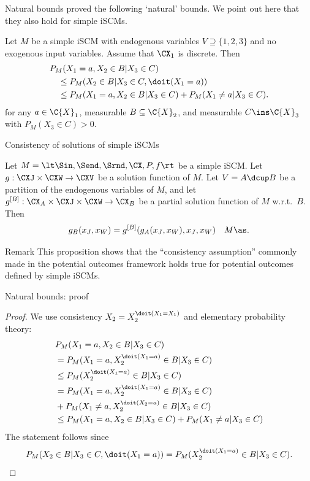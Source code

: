 \begin{frame}{Natural bounds}
\cite{ManskiNagin1998} proved the following `natural' bounds. We point out here that they also hold for simple iSCMs.
\begin{Thm}
  Let $M$ be a simple iSCM with endogenous variables $V \supseteq \{1,2,3\}$ and no exogenous input variables.
  Assume that $\CX_1$ is discrete.
  Then
  \begin{equation*}\begin{split}
    &P_M(X_1=a,X_2 \in B|X_3 \in C) \\
    &\quad\le P_M(X_2\in B|X_3 \in C, \doit(X_1=a)) \\
    &\quad\le P_M(X_1=a,X_2\in B|X_3 \in C) + P_M(X_1\ne a|X_3 \in C).
  \end{split}\end{equation*}
  for any $a\in\C{X}_1$, measurable $B \subseteq \C{X}_2$, and measurable $C \ins \C{X}_3$ with $P_M(X_3 \in C) > 0$.
\end{Thm}
\end{frame}

\begin{frame}{Consistency of solutions of simple iSCMs}
\begin{Prp}[\ref{prp:simple_scm_consistency}]
  Let $M = \lt \Sin, \Send, \Srnd, \CX, P, f \rt$ be a simple iSCM.
  Let $g : \CXJ \times \CXW \to \CXV$ be a solution function of $M$.
  Let $V = A \dcup B$ be a partition of the endogenous variables of $M$,
  and let $g^{[B]} : \CX_A \times \CXJ \times \CXW \to \CX_B$ be a partial solution function of $M$ w.r.t.\ $B$.
  Then
  $$g_B(x_J,x_W) = g^{[B]}(g_A(x_J,x_W),x_J,x_W)\quad M\as.$$
\end{Prp}

\bigskip
\begin{block}{Remark}
  This proposition shows that the ``consistency assumption'' commonly made in the potential outcomes framework
  holds true for potential outcomes defined by simple iSCMs.
\end{block}
\end{frame}

\begin{frame}{Natural bounds: proof}
\begin{proof}
  We use consistency $X_2=X_2^{\doit(X_1=X_1)}$ and elementary probability theory:
    \begin{align*}
      & P_M(X_1=a,X_2\in B|X_3 \in C) \\
      & = P_M(X_1=a,X_2^{\doit(X_1=a)}\in B|X_3 \in C) \\
      & \le P_M(X_2^{\doit(X_1=a)}\in B|X_3 \in C) \\
      & = P_M(X_1=a,X_2^{\doit(X_1=a)}\in B|X_3 \in C) \\
      & + P_M(X_1\ne a,X_2^{\doit(X_2=a)}\in B|X_3 \in C) \\
      & \le P_M(X_1=a,X_2\in B|X_3 \in C) + P_M(X_1 \ne a|X_3 \in C)
    \end{align*}
  The statement follows since
  $$ P_M(X_2\in B|X_3 \in C, \doit(X_1=a)) = P_M(X_2^{\doit(X_1=a)}\in B|X_3 \in C).$$
\end{proof}
\end{frame}

